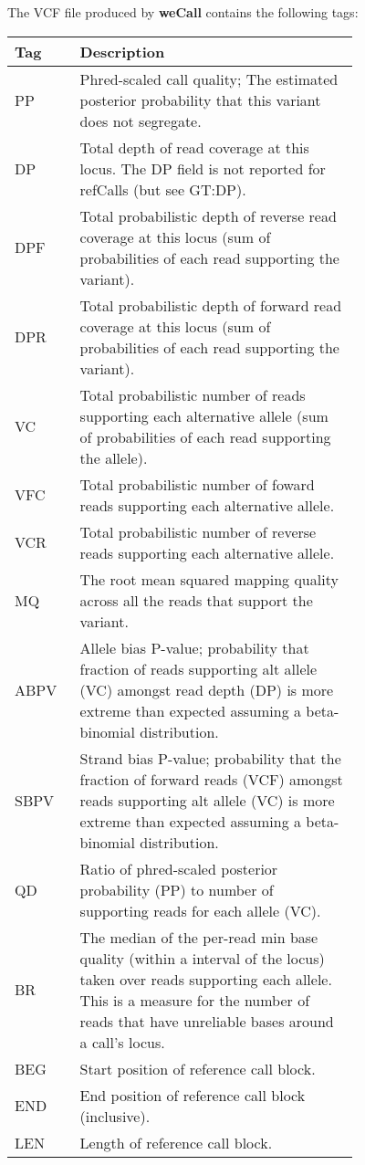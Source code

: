 \documentclass{article}
\newcommand{\wecallproduct}{\textbf{weCall}}
\begin{document}
The VCF file produced by {\wecallproduct} contains the following tags:
\begin{center}
\renewcommand{\arraystretch}{1.3}
\begin{tabular}{p{0.1\linewidth}p{0.65\linewidth}}
  Tag & Description \\ \hline 
   PP & Phred-scaled call quality; The estimated posterior probability that this variant does not segregate. \\
   DP & Total depth of read coverage at this locus. The DP field is not reported for refCalls (but see GT:DP). \\
   DPF & Total probabilistic depth of reverse read coverage at this locus (sum of probabilities of each read supporting the variant). \\
   DPR & Total probabilistic depth of forward read coverage at this locus (sum of probabilities of each read supporting the variant). \\
   VC & Total probabilistic number of reads supporting each alternative allele (sum of probabilities of each read supporting the allele).\\
   VFC & Total probabilistic number of foward reads supporting each alternative allele. \\
   VCR & Total probabilistic number of reverse reads supporting each alternative allele. \\
   MQ & The root mean squared mapping quality across all the reads that support the variant. \\
   ABPV & Allele bias P-value; probability that fraction of reads supporting alt allele (VC) amongst read depth (DP) is more extreme than expected assuming a beta-binomial distribution. \\
   SBPV & Strand bias P-value; probability that the fraction of forward reads (VCF) amongst reads supporting alt allele (VC) is more extreme than expected assuming a beta-binomial distribution. \\
   QD & Ratio of phred-scaled posterior probability (PP) to number of supporting reads for each allele (VC). \\
   BR & The median of the per-read min base quality (within a interval of the locus) taken over reads supporting each allele. This is a measure for the number of reads that have unreliable bases around a call's locus. \\ 
   BEG & Start position of reference call block.\\
   END & End position of reference call block (inclusive).\\
   LEN & Length of reference call block.\\ \hline
\end{tabular}
\end{center}
\end{document}
